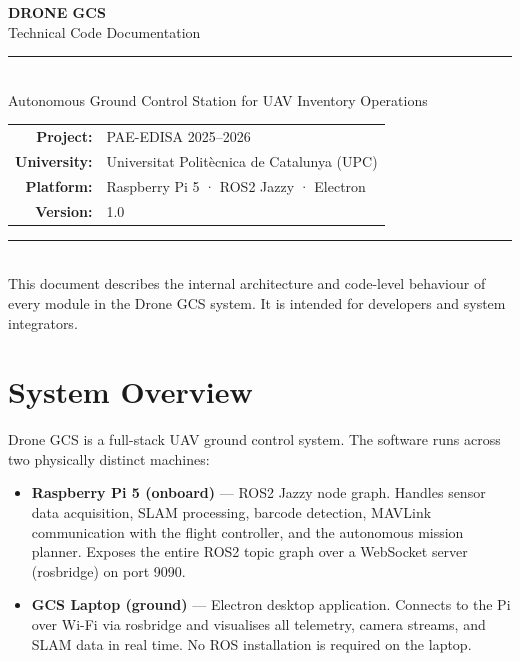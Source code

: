 \documentclass[11pt,a4paper]{article}
\begin{document}

\begin{titlepage}
  \pagecolor{darkbg}
  \color{white}
  \vspace*{4cm}
  \begin{center}
    {\fontsize{36}{44}\selectfont\bfseries DRONE GCS}\\[0.5em]
    {\Large\color{cyanaccent} Technical Code Documentation}\\[2em]
    \textcolor{cyanaccent}{\rule{10cm}{1.5pt}}\\[2em]
    {\large Autonomous Ground Control Station for UAV Inventory Operations}\\[3em]
    \begin{tabular}{rl}
      \textbf{Project:} & PAE-EDISA 2025--2026 \\[0.3em]
      \textbf{University:} & Universitat Politècnica de Catalunya (UPC) \\[0.3em]
      \textbf{Platform:} & Raspberry Pi 5 · ROS2 Jazzy · Electron \\[0.3em]
      \textbf{Version:} & 1.0 \\
    \end{tabular}
  \end{center}
  \vfill
  \textcolor{navyblue!60}{\rule{\textwidth}{0.4pt}}\\[0.3em]
  {\small\color{gray} This document describes the internal architecture and
   code-level behaviour of every module in the Drone GCS system.
   It is intended for developers and system integrators.}
\end{titlepage}
\nopagecolor
\color{black}

\tableofcontents
\clearpage

\section{System Overview}

Drone GCS is a full-stack UAV ground control system. The software runs across
two physically distinct machines:

\begin{itemize}
  \item \textbf{Raspberry Pi 5 (onboard)} — ROS2 Jazzy node graph. Handles
        sensor data acquisition, SLAM processing, barcode detection, MAVLink
        communication with the flight controller, and the autonomous mission
        planner. Exposes the entire ROS2 topic graph over a WebSocket server
        (rosbridge) on port 9090.
  \item \textbf{GCS Laptop (ground)} — Electron desktop application. Connects
        to the Pi over Wi-Fi via rosbridge and visualises all telemetry,
        camera streams, and SLAM data in real time. No ROS installation is
        required on the laptop.
\end{itemize}
\end{document}
